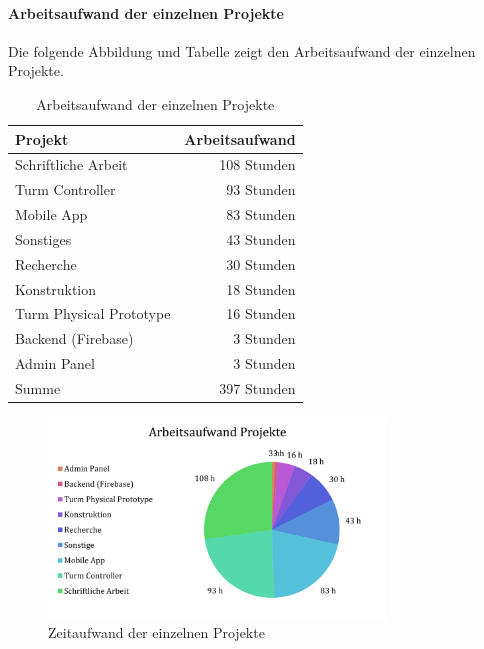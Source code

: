 \paragraph{Arbeitsaufwand der einzelnen Projekte}
Die folgende Abbildung und Tabelle zeigt den Arbeitsaufwand der einzelnen Projekte.

\begin{table}[!h]
  \centering
  \begin{tabular}{lr}
    \toprule
    \textbf{Projekt}        & \textbf{Arbeitsaufwand} \\
    \midrule
    Schriftliche Arbeit     & 108 Stunden             \\
    Turm Controller         & 93 Stunden              \\
    Mobile App              & 83 Stunden              \\
    Sonstiges               & 43 Stunden              \\
    Recherche               & 30 Stunden              \\
    Konstruktion            & 18 Stunden              \\
    Turm Physical Prototype & 16 Stunden              \\
    Backend (Firebase)      & 3 Stunden               \\
    Admin Panel             & 3 Stunden               \\
    \midrule
    Summe                   & 397 Stunden             \\
    \bottomrule
  \end{tabular}
  \caption{Arbeitsaufwand der einzelnen Projekte}
  \label{tab:zeiterfassung_projekte}
\end{table}

\begin{figure}[!ht]
  \centering
  \includegraphics[width=0.8\textwidth]{images/zeiterfassung_projekte.png}
  \caption{Zeitaufwand der einzelnen Projekte}
  \label{fig:zeiterfassung_projekte}
\end{figure}


